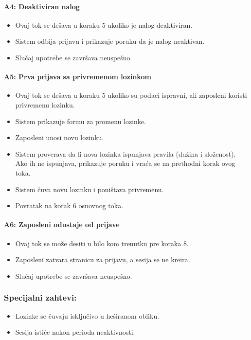 \paragraph*{A4: Deaktiviran nalog}
\begin{itemize}
	\item Ovaj tok se dešava u koraku 5 ukoliko je nalog deaktiviran.
	\item Sistem odbija prijavu i prikazuje poruku da je nalog neaktivan.
	\item Slučaj upotrebe se završava neuspešno.
\end{itemize}

\paragraph*{A5: Prva prijava sa privremenom lozinkom}
\begin{itemize}
	\item Ovaj tok se dešava u koraku 5 ukoliko su podaci ispravni, ali zaposleni koristi privremenu lozinku.
	\item Sistem prikazuje formu za promenu lozinke.
	\item Zaposleni unosi novu lozinku.
	\item Sistem proverava da li nova lozinka ispunjava pravila (dužina i složenost). Ako ih ne ispunjava, prikazuje poruku i vraća se na prethodni korak ovog toka.
	\item Sistem čuva novu lozinku i poništava privremenu.
	\item Povratak na korak 6 osnovnog toka.
\end{itemize}

\paragraph*{A6: Zaposleni odustaje od prijave}
\begin{itemize}
	\item Ovaj tok se može desiti u bilo kom trenutku pre koraka 8.
	\item Zaposleni zatvara stranicu za prijavu, a sesija se ne kreira.
	\item Slučaj upotrebe se završava neuspešno.
\end{itemize}

\subsubsection*{Specijalni zahtevi:}
\begin{itemize}
	\item Lozinke se čuvaju isključivo u heširanom obliku.
	\item Sesija ističe nakon perioda neaktivnosti.
\end{itemize}

